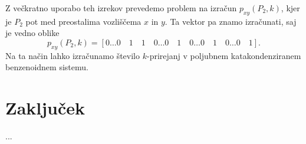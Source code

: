 \documentclass[mat1, tisk]{fmfdelo}
\begin{document}
Z večkratno uporabo teh izrekov
prevedemo problem na izračun 
$p_{xy}(P_2,k)$, kjer je $P_2$ pot med preostalima vozliščema $x$ in $y$. 
Ta vektor pa znamo izračunati,
saj je vedno oblike
$$
p_{xy}(P_2,k) = [0 \dots 0 \quad 1 \quad 1 \quad 0 \dots 0 \quad 1 \quad 0 \dots 0 \quad 1 \quad 0 \dots 0 \quad 1].
$$
Na ta način lahko izračunamo število $k$-prirejanj v poljubnem katakondenziranem benzenoidnem sistemu.















\section{Zaključek}
...
\end{document}
